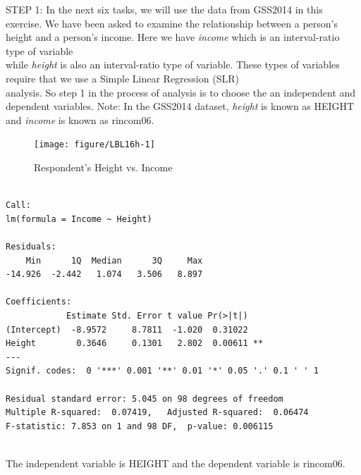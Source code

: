 \documentclass[11pt, chapterprefix=true]{scrbook}\usepackage[]{graphicx}\usepackage[]{color}
\begin{document}
\begin{exercises}
  \begin{exercise} %


    STEP 1: In the next six tasks, we will use the data from GSS2014 in this exercise.  We have been asked to examine the relationship between a person's height and a person's income.  Here we have {\textit{income}} which is an  interval-ratio type of variable \\ while {\textit{height}} is also an interval-ratio type of variable.  These types of variables require that we use a Simple Linear Regression (SLR) \\ analysis.  So step 1 in the process of analysis is to choose the an independent and dependent variables.  Note: In the GSS2014 dataset, {\textit{height}} is known as HEIGHT and {\textit{income}} is known as rincom06.

\begin{figure}[ht]

{\centering \texttt{[image: figure/LBL16h-1]} 

}

\caption[Respondent's Height vs]{Respondent's Height vs. Income}\label{fig:LBL16h}
\end{figure}



{\tiny{
  \begin{verbatim}

Call:
lm(formula = Income ~ Height)

Residuals:
    Min      1Q  Median      3Q     Max 
-14.926  -2.442   1.074   3.506   8.897 

Coefficients:
            Estimate Std. Error t value Pr(>|t|)   
(Intercept)  -8.9572     8.7811  -1.020  0.31022   
Height        0.3646     0.1301   2.802  0.00611 **
---
Signif. codes:  0 '***' 0.001 '**' 0.01 '*' 0.05 '.' 0.1 ' ' 1

Residual standard error: 5.045 on 98 degrees of freedom
Multiple R-squared:  0.07419,	Adjusted R-squared:  0.06474 
F-statistic: 7.853 on 1 and 98 DF,  p-value: 0.006115


  \end{verbatim}
}}

    \vspace{5mm}

    \end{exercise}
    \vspace{2mm}
    \begin{solution}
       The independent variable is HEIGHT and the dependent variable is rincom06.
    \end{solution}


\end{exercises}
\end{document}
